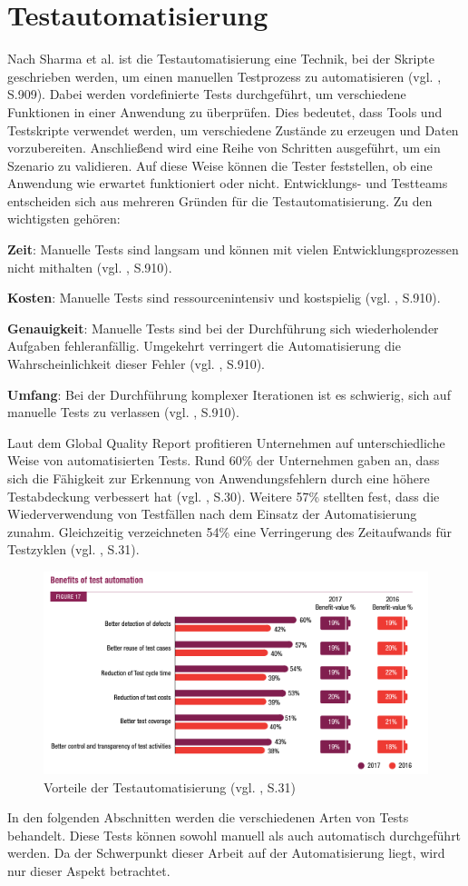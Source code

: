 \section{Testautomatisierung}

Nach Sharma et al. ist die Testautomatisierung eine Technik,
bei der Skripte geschrieben werden, um einen manuellen
Testprozess zu automatisieren (vgl. \cite{sharma2014web}, S.909). Dabei
werden vordefinierte Tests durchgeführt, um verschiedene Funktionen in einer Anwendung zu überprüfen.
Dies bedeutet, dass Tools und Testskripte verwendet werden, um verschiedene
Zustände zu erzeugen und Daten vorzubereiten. Anschließend wird eine
Reihe von Schritten ausgeführt, um ein Szenario zu validieren.
Auf diese Weise können die Tester feststellen, ob eine Anwendung
wie erwartet funktioniert oder nicht. Entwicklungs- und Testteams
entscheiden sich aus mehreren Gründen für die Testautomatisierung.
Zu den wichtigsten gehören:

\textbf{Zeit}: Manuelle Tests sind langsam und können mit vielen Entwicklungsprozessen
nicht mithalten (vgl. \cite{sharma2014web}, S.910).


\textbf{Kosten}: Manuelle Tests sind ressourcenintensiv und kostspielig
(vgl. \cite{sharma2014web}, S.910).


\textbf{Genauigkeit}: Manuelle Tests sind bei der Durchführung sich wiederholender
Aufgaben fehleranfällig. Umgekehrt verringert die Automatisierung die
Wahrscheinlichkeit dieser Fehler (vgl. \cite{sharma2014web}, S.910).


\textbf{Umfang}: Bei der Durchführung komplexer Iterationen ist es schwierig,
sich auf manuelle Tests zu verlassen (vgl. \cite{sharma2014web}, S.910).


Laut dem Global Quality Report profitieren Unternehmen auf unterschiedliche
Weise von automatisierten Tests. Rund 60\% der Unternehmen gaben an,
dass sich die Fähigkeit zur Erkennung von Anwendungsfehlern durch eine höhere
Testabdeckung verbessert hat (vgl. \cite{Buenen201718}, S.30). Weitere 57\% stellten fest, dass die Wiederverwendung von Testfällen nach
dem Einsatz der Automatisierung zunahm. Gleichzeitig verzeichneten 54\%
eine Verringerung des Zeitaufwands für
Testzyklen (vgl. \cite{Buenen201718}, S.31).

\begin{figure}
    \centering
    \includegraphics[scale=1.3]{images/benefits_of_test_automation}
    \caption{Vorteile der Testautomatisierung (vgl. \cite{Buenen201718}, S.31)} \label{fig:mof}
\end{figure}

In den folgenden Abschnitten werden die verschiedenen Arten von Tests
behandelt. Diese Tests können sowohl manuell als auch automatisch
durchgeführt werden. Da der Schwerpunkt dieser Arbeit auf der
Automatisierung liegt, wird nur dieser Aspekt betrachtet.
